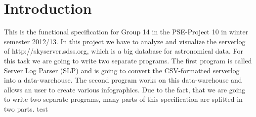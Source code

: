 \section{Introduction}
This is the functional specification for Group 14 in the PSE-Project 10 in winter semester 2012/13. 
In this project we have to analyze and visualize the serverlog of http://skyserver.sdss.org, which is a big database for astronomical 
data. For this task we are going to write two separate programs. The first program is called Server Log Parser (SLP)
and is going to convert the CSV-formatted serverlog into a data-warehouse. The second program works on this data-warehouse
and allows an user to create various infographics. Due to the fact, that we are going to write two separate programs, many parts
of this specification are splitted in two parts. 
\newline
\newline
test
